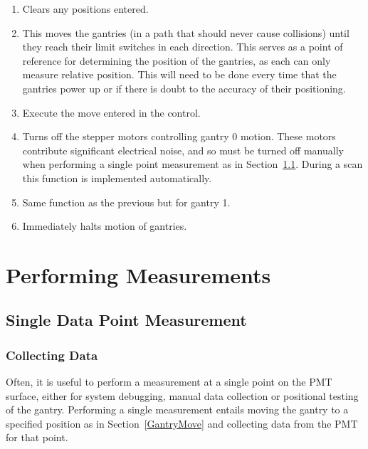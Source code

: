 \documentclass[twoside,letterpaper]{refart}
\begin{document}
\begin{enumerate}
	\item[\textbf{Clear Input}] Clears any positions entered.
	
	\item[\textbf{(Re-)Initialize}] This moves the gantries (in a path that should never cause collisions) until they reach their limit switches in each direction. This serves as a point of reference for determining the position of the gantries, as each can only measure relative position. This will need to be done every time that the gantries power up or if there is doubt to the accuracy of their positioning.
	
	\item[\textbf{Move}] Execute the move entered in the control.
	
	\item[\textbf{Power off Gantry 0}] Turns off the stepper motors controlling gantry 0 motion. These motors contribute significant electrical noise, and so must be turned off manually when performing a single point measurement as in Section~\ref{singleData}. During a scan this function is implemented automatically.
	
	\item[\textbf{Power off Gantry 1}] Same function as the previous but for gantry 1.

	\item[\textbf{Stop Gantries}] Immediately halts motion of gantries.

\end{enumerate}

\clearpage

\section{Performing Measurements}

\subsection{Single Data Point Measurement}\label{singleData}

\subsubsection{Collecting Data}


Often, it is useful to perform a measurement at a single point on the PMT surface, either for system debugging, manual data collection or positional testing of the gantry. Performing a single measurement entails moving the gantry to a specified position as in Section~\ref{GantryMove} and collecting data from the PMT for that point.
\end{document}
